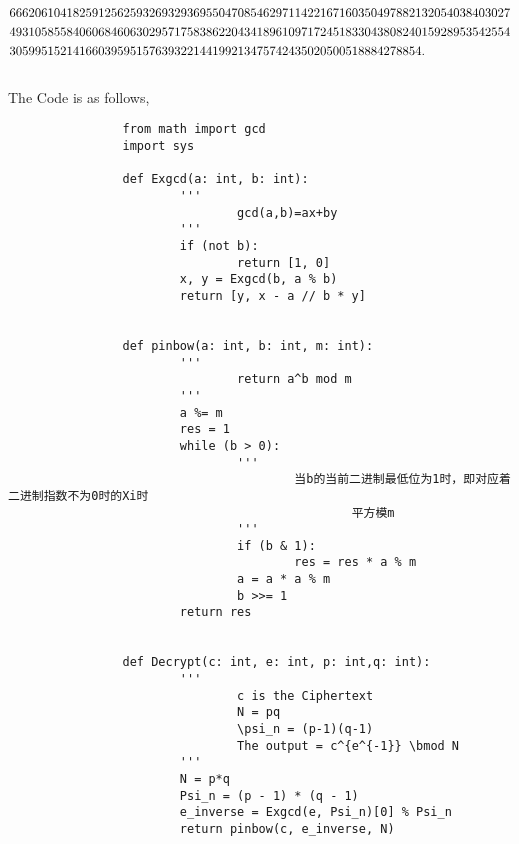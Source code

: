 \documentclass{article}
\theoremstyle{break}
\begin{document}
\begin{enumerate}
\[\begin{aligned}
                        &6662061041825912562593269329369550470854629711422167160350497882132054038403027\\
                        &4931058558406068460630295717583862204341896109717245183304380824015928953542554\\
                        &30599515214166039595157639322144199213475742435020500518884278854.\\
                        \leavevmode\\                                                                                                 
                \end{aligned}
        \]
        \newpage
        The Code is as follows,\\
        \begin{lstlisting}
                from math import gcd
                import sys

                def Exgcd(a: int, b: int):
                        '''
                                gcd(a,b)=ax+by
                        '''
                        if (not b):
                                return [1, 0]
                        x, y = Exgcd(b, a % b)
                        return [y, x - a // b * y]


                def pinbow(a: int, b: int, m: int):
                        '''
                                return a^b mod m
                        '''
                        a %= m
                        res = 1
                        while (b > 0):
                                '''
                                        当b的当前二进制最低位为1时，即对应着二进制指数不为0时的Xi时
                                                平方模m
                                '''
                                if (b & 1): 
                                        res = res * a % m
                                a = a * a % m
                                b >>= 1
                        return res


                def Decrypt(c: int, e: int, p: int,q: int):
                        '''
                                c is the Ciphertext
                                N = pq
                                \psi_n = (p-1)(q-1)
                                The output = c^{e^{-1}} \bmod N
                        '''
                        N = p*q
                        Psi_n = (p - 1) * (q - 1)
                        e_inverse = Exgcd(e, Psi_n)[0] % Psi_n
                        return pinbow(c, e_inverse, N)



\end{lstlisting}
\end{enumerate}
\end{document}
